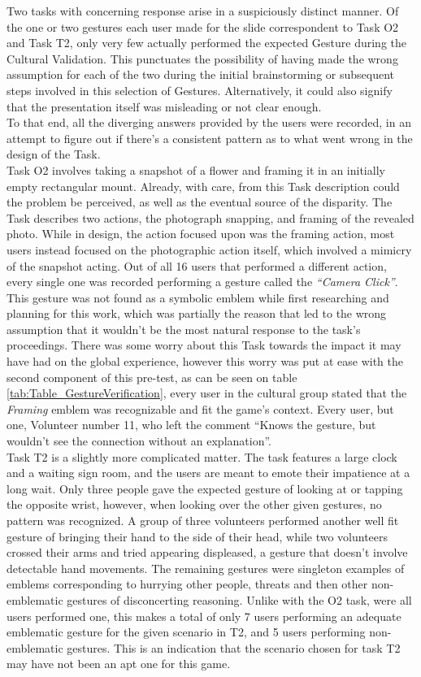     Two tasks with concerning response arise in a suspiciously distinct manner. Of the one or two gestures each user made for the slide correspondent to Task O2 and Task T2, only very few actually performed the expected Gesture during the Cultural Validation. This punctuates the possibility of having made the wrong assumption for each of the two during the initial brainstorming or subsequent steps involved in this selection of Gestures. Alternatively, it could also signify that the presentation itself was misleading or not clear enough.\\
    To that end, all the diverging answers provided by the users were recorded, in an attempt to figure out if there’s a consistent pattern as to what went wrong in the design of the Task.\\
    Task O2 involves taking a snapshot of a flower and framing it in an initially empty rectangular mount. Already, with care, from this Task description could the problem be perceived, as well as the eventual source of the disparity. The Task describes two actions, the photograph snapping, and framing of the revealed photo. While in design, the action focused upon was the framing action, most users instead focused on the photographic action itself, which involved a mimicry of the snapshot acting. Out of all 16 users that performed a different action, every single one was recorded performing a gesture called the \emph{“Camera Click”}. This gesture was not found as a symbolic emblem while first researching and planning for this work, which was partially the reason that led to the wrong assumption that it wouldn’t be the most natural response to the task’s proceedings. There was some worry about this Task towards the impact it may have had on the global experience, however this worry was put at ease with the second component of this pre-test, as can be seen on table \ref{tab:Table_GestureVerification}, every user in the cultural group stated that the \emph{Framing} emblem was recognizable and fit the game’s context. Every user, but one, Volunteer number 11, who left the comment “Knows the gesture, but wouldn’t see the connection without an explanation”.\\
    Task T2 is a slightly more complicated matter. The task features a large clock and a waiting sign room, and the users are meant to emote their impatience at a long wait. Only three people gave the expected gesture of looking at or tapping the opposite wrist, however, when looking over the other given gestures, no pattern was recognized. A group of three volunteers performed another well fit gesture of bringing their hand to the side of their head, while two volunteers crossed their arms and tried appearing displeased, a gesture that doesn’t involve detectable hand movements. The remaining gestures were singleton examples of emblems corresponding to hurrying other people, threats and then other non-emblematic gestures of disconcerting reasoning. Unlike with the O2 task, were all users performed one, this makes a total of only 7 users performing an adequate emblematic gesture for the given scenario in T2, and 5 users performing non-emblematic gestures. This is an indication that the scenario chosen for task T2 may have not been an apt one for this game.\\
